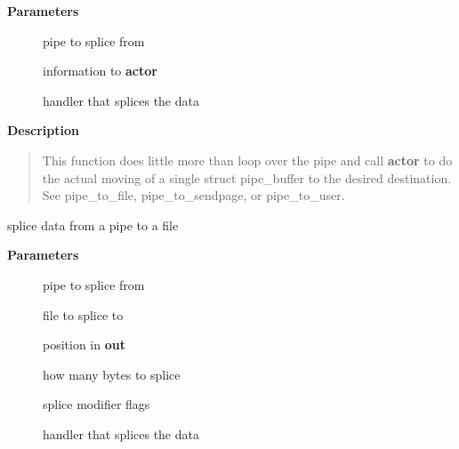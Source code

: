 \documentclass[a4paper,8pt,english]{sphinxmanual}
\begin{document}
\textbf{Parameters}
\begin{description}
\item[{}] \leavevmode
pipe to splice from

\item[{}] \leavevmode
information to \textbf{actor}

\item[{}] \leavevmode
handler that splices the data

\end{description}

\textbf{Description}
\begin{quote}

This function does little more than loop over the pipe and call
\textbf{actor} to do the actual moving of a single struct pipe\_buffer to
the desired destination. See pipe\_to\_file, pipe\_to\_sendpage, or
pipe\_to\_user.
\end{quote}

\begin{fulllineitems}
\label{filesystems/index:c.splice_from_pipe}
splice data from a pipe to a file

\end{fulllineitems}


\textbf{Parameters}
\begin{description}
\item[{}] \leavevmode
pipe to splice from

\item[{}] \leavevmode
file to splice to

\item[{}] \leavevmode
position in \textbf{out}

\item[{}] \leavevmode
how many bytes to splice

\item[{}] \leavevmode
splice modifier flags

\item[{}] \leavevmode
handler that splices the data

\end{description}
\end{document}
